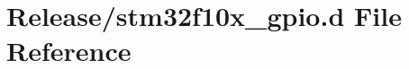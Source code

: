\hypertarget{stm32f10x__gpio_8d}{}\section{Release/stm32f10x\+\_\+gpio.d File Reference}
\label{stm32f10x__gpio_8d}
